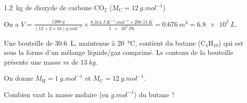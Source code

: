 \begin{enonce}
\SI{1,2}{kg} de dioxyde de carbone $\mathrm{CO_2}$ ($M_\mathrm{C}=\SI{12}{g.mol^{-1}}$)		
\end{enonce}


\begin{corrige}
On a $V=\frac{\SI{1200}{g}}{(12 + 2\times 16) \si{g.mol^{-1}}}\times \frac{\SI{8,314}{J.K^{-1}.mol^{-1}}\times\SI{298.15}{K}}{\SI{1e5}{Pa}}=\SI{0.676}{m^3}=\SI{6.8e2}{L}$.	
\end{corrige}

\finEntrainement








\hauteurLargeurCadreReponse		{7mm}{3cm}
\initialisationEntrainement

Une bouteille de \SI{30,6}{L}, maintenue à \SI{20}{\celsius}, contient du butane ($\mathrm{C_4H_{10}}$) qui est sous la forme d'un mélange liquide/gaz comprimé. Le contenu de la bouteille présente une masse $m$ de $\SI{13}{kg}$. 

On donne $M_\mathrm{H}=\SI{1}{g.mol^{-1}}$ et $M_\mathrm{C}=\SI{12}{g.mol^{-1}}$.

\debutEntrainement

\begin{enonce}
Combien vaut la masse molaire (en $\si{g.mol^{-1}}$) du butane ?
\end{enonce}

